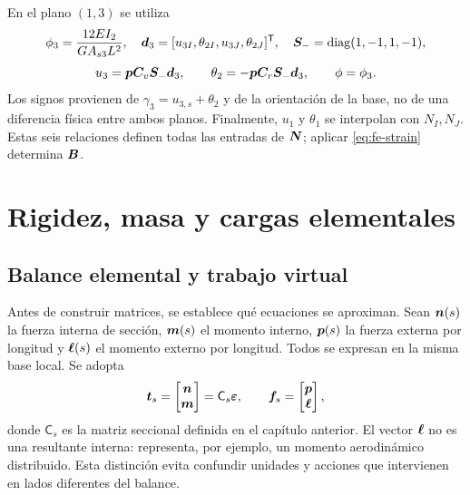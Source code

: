 En el plano $(1,3)$ se utiliza
\begin{equation}
 \phi_3=\frac{12EI_2}{GA_{s3}L^2},\quad
 \bm{d}_3=[u_{3I},\theta_{2I},u_{3J},\theta_{2J}]^{\mathsf T},\quad
 \boldsymbol{S}_- =\operatorname{diag}(1,-1,1,-1),
\end{equation}
\begin{equation}
 u_3=\bm{p}\boldsymbol{C}_v\boldsymbol{S}_-\bm{d}_3,\qquad
 \theta_2=-\bm{p}\boldsymbol{C}_r\boldsymbol{S}_-\bm{d}_3,
 \qquad \phi=\phi_3.
\end{equation}
Los signos provienen de $\gamma_3=u_{3,s}+\theta_2$ y de la orientación de la
base, no de una diferencia física entre ambos planos. Finalmente, $u_1$ y
$\theta_1$ se interpolan con $N_I,N_J$. Estas seis relaciones definen todas
las entradas de $\boldsymbol{N}$; aplicar \eqref{eq:fe-strain} determina $\boldsymbol{B}$.

\section{Rigidez, masa y cargas elementales}

\subsection{Balance elemental y trabajo virtual}

Antes de construir matrices, se establece qué ecuaciones se aproximan. Sean
$\bm{n}(s)$ la fuerza interna de sección, $\bm{m}(s)$ el momento interno,
$\bm{p}(s)$ la fuerza externa por longitud y $\bm{\ell}(s)$ el momento externo
por longitud. Todos se expresan en la misma base local. Se adopta
\begin{equation}
 \bm{t}_s=\begin{bmatrix}\bm{n}\\\bm{m}\end{bmatrix}
 =\mathsf C_s\bm{\varepsilon},
 \qquad
 \bm{f}_s=\begin{bmatrix}\bm{p}\\\bm{\ell}\end{bmatrix},
\end{equation}
donde $\mathsf C_s$ es la matriz seccional definida en el capítulo anterior.
El vector $\bm{\ell}$ no es una resultante interna: representa, por ejemplo,
un momento aerodinámico distribuido. Esta distinción evita confundir unidades
y acciones que intervienen en lados diferentes del balance.

